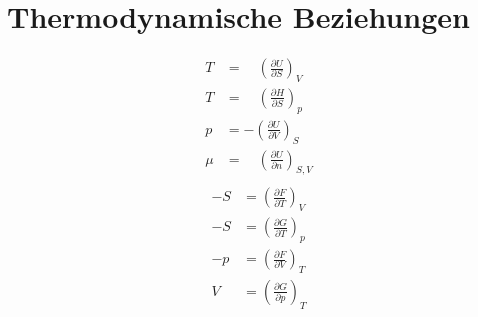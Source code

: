 \documentclass[twocolumn]{article}
\begin{document}
\section{Thermodynamische Beziehungen}
\begin{multicols}{2}

\begin{align*}
T &= \quad \left(\frac{\partial U}{\partial S}\right)_{V} \\
T &= \quad \left(\frac{\partial H}{\partial S}\right)_{p} \\
p &= - \left(\frac{\partial U}{\partial V}\right)_{S} \\
\mu &= \quad \left(\frac{\partial U}{\partial n}\right)_{S,V}  \\
\end{align*}
	\begin{align*}
		-S &= \left(\frac{\partial F}{\partial T}\right)_{V} \\
		-S &= \left(\frac{\partial G}{\partial T}\right)_{p} \\
		-p &= \left(\frac{\partial F}{\partial V}\right)_{T} \\
		V &= \left(\frac{\partial G}{\partial p}\right)_{T}  \\
	\end{align*}
\end{multicols}

\pagebreak
\end{document}
